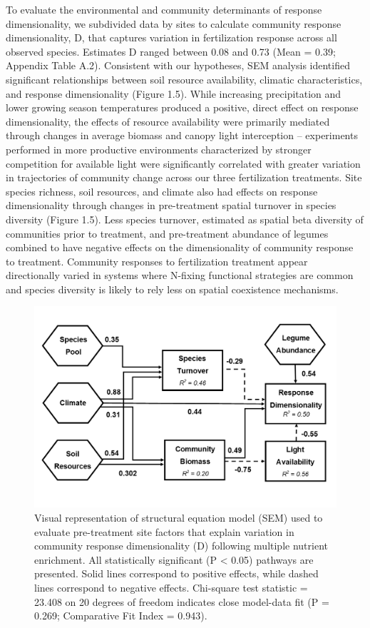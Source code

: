 \documentclass[twoside,12pt,final]{ucthesis-CA2012}
\begin{document}
\begin{ucmainmatter}
To evaluate the environmental and community determinants of response dimensionality, we subdivided data by sites to calculate community response dimensionality, D, that captures variation in fertilization response across all observed species. Estimates D ranged between 0.08 and 0.73 (Mean = 0.39; Appendix Table A.2).
Consistent with our hypotheses, SEM analysis identified significant relationships between soil resource availability, climatic characteristics, and response dimensionality (Figure 1.5). While increasing precipitation and lower growing season temperatures produced a positive, direct effect on response dimensionality, the effects of resource availability were primarily mediated through changes in average biomass and canopy light interception -- experiments performed in more productive environments characterized by stronger competition for available light were significantly correlated with greater variation in trajectories of community change across our three fertilization treatments.
Site species richness, soil resources, and climate also had effects on response dimensionality through changes in pre-treatment spatial turnover in species diversity (Figure 1.5). Less species turnover, estimated as spatial beta diversity of communities prior to treatment, and pre-treatment abundance of legumes combined to have negative effects on the dimensionality of community response to treatment. Community responses to fertilization treatment appear directionally varied in systems where N-fixing functional strategies are common and species diversity is likely to rely less on spatial coexistence mechanisms.
\begin{figure}
\centering
\includegraphics[width=\textwidth,height=0.5\textheight]{figure/Fig1_5.png}
\caption{Visual representation of structural equation model (SEM) used to evaluate pre-treatment site factors that explain variation in community response dimensionality (D) following multiple nutrient enrichment. All statistically significant (P \textless{} 0.05) pathways are presented. Solid lines correspond to positive effects, while dashed lines correspond to negative effects. Chi-square test statistic = 23.408 on 20 degrees of freedom indicates close model-data fit (P = 0.269; Comparative Fit Index = 0.943). \label{fig-1-5}}
\end{figure}
\hypertarget{discussion}{%
}
\end{ucmainmatter}
\end{document}
